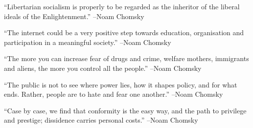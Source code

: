 \documentclass{article}%
\begin{document}
\linebreak%
\vspace{1mm}%
\begin{minipage}{\textwidth}%
\flushleft%
“Libertarian socialism is properly to be regarded as the inheritor of the liberal ideals of the Enlightenment.”%
\linebreak%
\vspace{1mm}%
–Noam Chomsky%
\linebreak%
\vspace{1mm}%
\end{minipage}%
\linebreak%
\vspace{1mm}%
\begin{minipage}{\textwidth}%
\flushleft%
“The internet could be a very positive step towards education, organisation and participation in a meaningful society.”%
\linebreak%
\vspace{1mm}%
–Noam Chomsky%
\linebreak%
\vspace{1mm}%
\end{minipage}%
\linebreak%
\vspace{1mm}%
\begin{minipage}{\textwidth}%
\flushleft%
“The more you can increase fear of drugs and crime, welfare mothers, immigrants and aliens, the more you control all the people.”%
\linebreak%
\vspace{1mm}%
–Noam Chomsky%
\linebreak%
\vspace{1mm}%
\end{minipage}%
\linebreak%
\vspace{1mm}%
\begin{minipage}{\textwidth}%
\flushleft%
“The public is not to see where power lies, how it shapes policy, and for what ends. Rather, people are to hate and fear one another.”%
\linebreak%
\vspace{1mm}%
–Noam Chomsky%
\linebreak%
\vspace{1mm}%
\end{minipage}%
\linebreak%
\vspace{1mm}%
\begin{minipage}{\textwidth}%
\flushleft%
“Case by case, we find that conformity is the easy way, and the path to privilege and prestige; dissidence carries personal costs.”%
\linebreak%
\vspace{1mm}%
–Noam Chomsky%
\linebreak%
\vspace{1mm}%
\end{minipage}%
\end{document}
